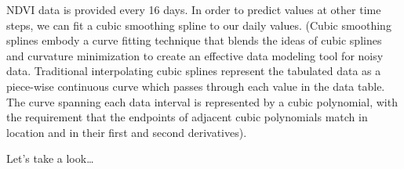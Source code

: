 \documentclass[
]{book}
\newenvironment{Shaded}{\begin{snugshade}}{\end{snugshade}}
\newcommand{\DataTypeTok}[1]{\textcolor[rgb]{0.13,0.29,0.53}{#1}}
\newcommand{\FloatTok}[1]{\textcolor[rgb]{0.00,0.00,0.81}{#1}}
\newcommand{\KeywordTok}[1]{\textcolor[rgb]{0.13,0.29,0.53}{\textbf{#1}}}
\newcommand{\NormalTok}[1]{#1}
\newcommand{\OperatorTok}[1]{\textcolor[rgb]{0.81,0.36,0.00}{\textbf{#1}}}
\newcommand{\StringTok}[1]{\textcolor[rgb]{0.31,0.60,0.02}{#1}}
\begin{document}
NDVI data is provided every 16 days. In order to predict values at other time steps, we can fit a cubic smoothing spline to our daily values. (Cubic smoothing splines embody a curve fitting technique that blends the ideas of cubic splines and curvature minimization to create an effective data modeling tool for noisy data. Traditional interpolating cubic splines represent the tabulated data as a piece-wise continuous curve which passes through each value in the data table. The curve spanning each data interval is represented by a cubic polynomial, with the requirement that the endpoints of adjacent cubic polynomials match in location and in their first and second derivatives).

\begin{Shaded}
\end{Shaded}

Let's take a look\ldots{}

\begin{Shaded}
\end{Shaded}
\end{document}
